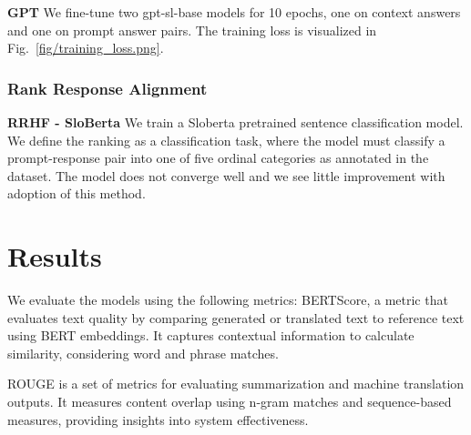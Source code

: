 \documentclass[fleqn,moreauthors,10pt]{ds_report}
\begin{document}
    \noindent\textbf{GPT} We fine-tune two gpt-sl-base models for 10 epochs, one on context answers and one on prompt answer pairs. The training loss is visualized in  Fig.~\ref{fig/training_loss.png}.


    \subsubsection*{Rank Response Alignment}
    
    \noindent\textbf{RRHF - SloBerta}
    We train a Sloberta pretrained sentence classification model. We define the ranking as a classification task, where the model must classify a prompt-response pair into one of five ordinal categories as annotated in the dataset. The model does not converge well and we see little improvement with adoption of this method.



\section*{Results}


    We evaluate the models using the following metrics:
    BERTScore, a metric that evaluates text quality by comparing generated or translated text to reference text using BERT embeddings. It captures contextual information to calculate similarity, considering word and phrase matches.

    ROUGE is a set of metrics for evaluating summarization and machine translation outputs. It measures content overlap using n-gram matches and sequence-based measures, providing insights into system effectiveness.
\end{document}
